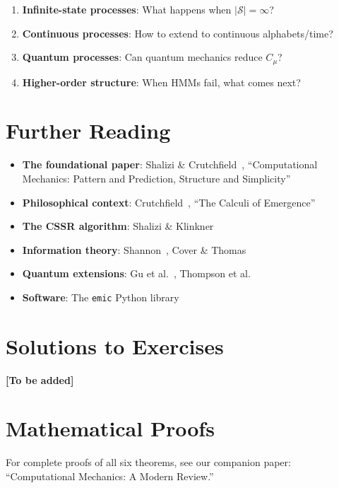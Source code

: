 \documentclass[11pt,a4paper]{article}
\theoremstyle{definition}
\theoremstyle{plain}
\newcommand{\Cmu}{C_\mu}
\newcommand{\calS}{\mathcal{S}}
\begin{document}
\begin{enumerate}
    \item \textbf{Infinite-state processes}: What happens when $|\calS| = \infty$?
    \item \textbf{Continuous processes}: How to extend to continuous alphabets/time?
    \item \textbf{Quantum processes}: Can quantum mechanics reduce $\Cmu$?
    \item \textbf{Higher-order structure}: When HMMs fail, what comes next?
\end{enumerate}

\section{Further Reading}
\label{sec:further-reading}

\begin{itemize}
    \item \textbf{The foundational paper}: Shalizi \& Crutchfield~\cite{shalizi2001computational}, ``Computational Mechanics: Pattern and Prediction, Structure and Simplicity''
    \item \textbf{Philosophical context}: Crutchfield~\cite{crutchfield1994calculi}, ``The Calculi of Emergence''
    \item \textbf{The CSSR algorithm}: Shalizi \& Klinkner~\cite{shalizi2004algorithm}
    \item \textbf{Information theory}: Shannon~\cite{shannon1948mathematical}, Cover \& Thomas~\cite{cover2006elements}
    \item \textbf{Quantum extensions}: Gu et al.~\cite{gu2012quantum}, Thompson et al.~\cite{thompson2018causal}
    \item \textbf{Software}: The \texttt{emic} Python library~\cite{emic2026}
\end{itemize}

\appendix

\section{Solutions to Exercises}

\textbf{[To be added]}

\section{Mathematical Proofs}

For complete proofs of all six theorems, see our companion paper: ``Computational Mechanics: A Modern Review.''



\end{document}
